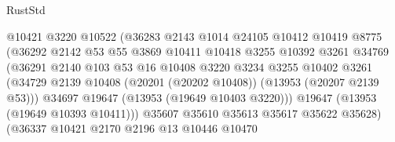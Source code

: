 \begin{lexlean}{RustStd}
\begin{coremodule}
                                    @10421
                                    @3220
                                    @10522
                                    (@36283
                                      @2143
                                      @1014
                                      @24105
                                      @10412
                                      @10419
                                      @8775
                                      (@36292
                                        @2142
                                        @53
                                        @55
                                        @3869
                                        @10411
                                        @10418
                                        @3255
                                        @10392
                                        @3261
                                        @34769
                                        (@36291
                                          @2140
                                          @103
                                          @53
                                          @16
                                          @10408
                                          @3220
                                          @3234
                                          @3255
                                          @10402
                                          @3261
                                          (@34729
                                            @2139
                                            @10408
                                            (@20201 (@20202 @10408))
                                            (@13953 (@20207 @2139 @53)))
                                          @34697
                                          @19647
                                          (@13953 (@19649 @10403 @3220)))
                                        @19647
                                        (@13953 (@19649 @10393 @10411)))
                                      @35607
                                      @35610
                                      @35613
                                      @35617
                                      @35622
                                      @35628)
                                    (@36337
                                      @10421
                                      @2170
                                      @2196
                                      @13
                                      @10446
                                      @10470

\end{coremodule}
\end{lexlean}
